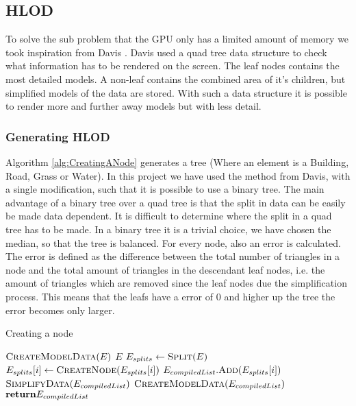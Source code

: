 \subsection{HLOD}
\label{subsec:HLOD}
To solve the sub problem that the GPU only has a limited amount of memory we took inspiration from Davis \cite{Davis}. Davis used a quad tree data structure to check what information has to be rendered on the screen. The leaf nodes contains the most detailed models. A non-leaf contains the combined area of it's children, but simplified models of the data are stored. With such a data structure it is possible to render more and further away models but with less detail.

\subsubsection{Generating HLOD}
Algorithm \ref{alg:CreatingANode} generates a tree (Where an element is a Building, Road, Grass or Water). In this project we have used the method from Davis, with a single modification, such that it is possible to use a binary tree. The main advantage of a binary tree over a quad tree is that the split in data can be easily be made data dependent. It is difficult to determine where the split in a quad tree has to be made. In a binary tree it is a trivial choice, we have chosen the median, so that the tree is balanced. For every node, also an error is calculated. The error is defined as the difference between the total number of triangles in a node and the total amount of triangles in the descendant leaf nodes, i.e. the amount of triangles which are removed since the leaf nodes due the simplification process. This means that the leafs have a error of 0 and higher up the tree the error becomes only larger.

\begin{algorithm}[h]
\caption{Creating a node}\label{alg:CreatingANode}
\begin{algorithmic}[1]
    \State $\Call{CreateModelData}{E}$
    \State \Return $E$
\Else
    \State $E_{splits}\gets \Call{Split}{E}$ 
        \State $E_{splits}[i] \gets \Call{CreateNode}{E_{splits}[i]}$
        \State $E_{compiledList}.\Call{Add}{E_{splits}[i]}$
    \EndFor
    \State $\Call{SimplifyData}{E_{compiledList}}$
    \State $\Call{CreateModelData}{E_{compiledList}}$
    \State $\Return E_{compiledList}$
\EndIf
\EndProcedure
\end{algorithmic}
\end{algorithm}

